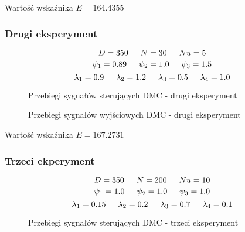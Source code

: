 Wartość wskaźnika $E=\num{164.4355}$

\newpage
\subsubsection{Drugi eksperyment}

$$D=350 \indent  N=30 \indent  Nu=5$$ 
$$\psi_1=\num{0.89} \indent \psi_2=\num{1.0} \indent \psi_3=\num{1.5}$$
$$\lambda_1=\num{0.9} \indent \lambda_2=\num{1.2} \indent \lambda_3=\num{0.5} \indent \lambda_4=\num{1.0}$$

\ifdefined\CompileFigures
    \begin{figure}[H] 
            \centering
            
            \caption{Przebiegi sygnałów sterujących DMC - drugi eksperyment}
            \label{projekt:zad6:figure:projzadanie6DMC2u}
    \end{figure}
\fi


\ifdefined\CompileFigures
    \begin{figure}[H] 
            \centering
            
            \caption{Przebiegi sygnałów wyjściowych DMC - drugi eksperyment}
            \label{projekt:zad6:figure:projzadanie6DMC2y}
    \end{figure}
\fi

Wartość wskaźnika $E=\num{167.2731}$

\newpage
\subsubsection{Trzeci ekperyment}
$$D=350 \indent  N=200 \indent  Nu=10$$ 
$$\psi_1=\num{1.0} \indent \psi_2=\num{1.0} \indent \psi_3=\num{1.0}$$
$$\lambda_1=\num{0.15} \indent \lambda_2=\num{0.2} \indent \lambda_3=\num{0.7} \indent \lambda_4=\num{0.1}$$


\ifdefined\CompileFigures
    \begin{figure}[H] 
            \centering
            
            \caption{Przebiegi sygnałów sterujących DMC - trzeci eksperyment}
            \label{projekt:zad6:figure:projzadanie6DMCBESTu}
    \end{figure}
\fi


